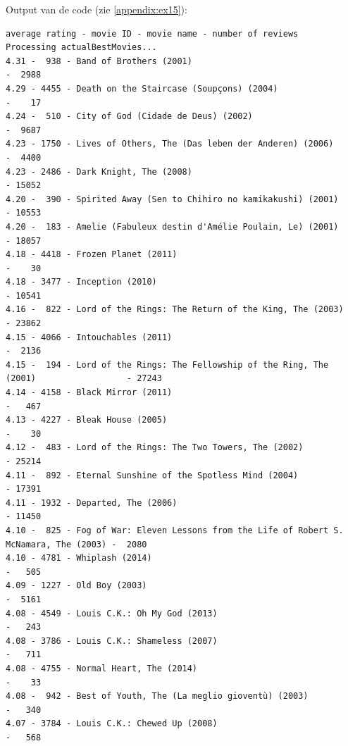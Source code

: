 \documentclass[11pt, a4paper, titlepage, openright]{article}
\begin{document}
	Output van de code (zie \ref{appendix:ex15}):
\begin{lstlisting}
average rating - movie ID - movie name - number of reviews
Processing actualBestMovies...
4.31 -  938 - Band of Brothers (2001)                                                    -  2988
4.29 - 4455 - Death on the Staircase (Soupçons) (2004)                                   -    17
4.24 -  510 - City of God (Cidade de Deus) (2002)                                        -  9687
4.23 - 1750 - Lives of Others, The (Das leben der Anderen) (2006)                        -  4400
4.23 - 2486 - Dark Knight, The (2008)                                                    - 15052
4.20 -  390 - Spirited Away (Sen to Chihiro no kamikakushi) (2001)                       - 10553
4.20 -  183 - Amelie (Fabuleux destin d'Amélie Poulain, Le) (2001)                       - 18057
4.18 - 4418 - Frozen Planet (2011)                                                       -    30
4.18 - 3477 - Inception (2010)                                                           - 10541
4.16 -  822 - Lord of the Rings: The Return of the King, The (2003)                      - 23862
4.15 - 4066 - Intouchables (2011)                                                        -  2136
4.15 -  194 - Lord of the Rings: The Fellowship of the Ring, The (2001)                  - 27243
4.14 - 4158 - Black Mirror (2011)                                                        -   467
4.13 - 4227 - Bleak House (2005)                                                         -    30
4.12 -  483 - Lord of the Rings: The Two Towers, The (2002)                              - 25214
4.11 -  892 - Eternal Sunshine of the Spotless Mind (2004)                               - 17391
4.11 - 1932 - Departed, The (2006)                                                       - 11450
4.10 -  825 - Fog of War: Eleven Lessons from the Life of Robert S. McNamara, The (2003) -  2080
4.10 - 4781 - Whiplash (2014)                                                            -   505
4.09 - 1227 - Old Boy (2003)                                                             -  5161
4.08 - 4549 - Louis C.K.: Oh My God (2013)                                               -   243
4.08 - 3786 - Louis C.K.: Shameless (2007)                                               -   711
4.08 - 4755 - Normal Heart, The (2014)                                                   -    33
4.08 -  942 - Best of Youth, The (La meglio gioventù) (2003)                             -   340
4.07 - 3784 - Louis C.K.: Chewed Up (2008)                                               -   568

\end{lstlisting}
\end{document}

